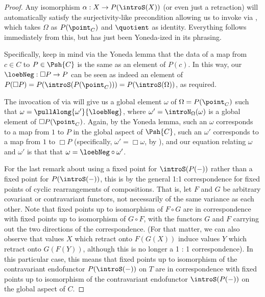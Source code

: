 \begin{proof}
Any isomorphism $\alpha : X \to P(\introS(X))$ (or even just a retraction) will automatically satisfy the surjectivity-like precondition allowing us to invoke  via , which takes $\Omega$ as $P(\point_C)$ and $\quotient$ as identity. Everything follows immediately from this, but has just been Yoneda-ized in its phrasing.

Specifically, keep in mind via the Yoneda lemma that the data of a map from $c \in C$ to $P \in \Psh{C}$ is the same as an element of $P(c)$. In this way, our $\loebNeg : \Box P \to P$ can be seen as indeed an element of $P(\Box P) = P(\introS(P(\point_C))) = P(\introS(\Omega))$, as required.

The invocation of  via  will give us a global element $\omega$ of $\Omega = P(\point_C)$ such that $\omega = \pullAlong{\omega'}{\loebNeg}$, where $\omega' = \introN_{\Omega}(\omega)$ is a global element of $\Box P(\point_C)$. Again, by the Yoneda lemma, such an $\omega$ corresponds to a map from $1$ to $P$ in the global aspect of $\Psh{C}$, such an $\omega'$ corresponds to a map from $1$ to $\Box P$ (specifically, $\omega' = \Box \omega$, by ), and our equation relating $\omega$ and $\omega'$ is that that $\omega = \loebNeg \circ \omega'$.

For the last remark about using a fixed point for $\introS(P(-))$ rather than a fixed point for $P(\introS(-))$, this is by the general 1:1 correspondence for fixed points of cyclic rearrangements of compositions. That is, let $F$ and $G$ be arbitrary covariant or contravariant functors, not necessarily of the same variance as each other. Note that fixed points up to isomorphism of $F \circ G$ are in correspondence with fixed points up to isomorphism of $G \circ F$, with the functors $G$ and $F$ carrying out the two directions of the correspondence. (For that matter, we can also observe that values $X$ which retract onto $F(G(X))$ induce values $Y$ which retract onto $G(F(Y))$, although this is no longer a 1 : 1 correspondence). In this particular case, this means that fixed points up to isomorphism of the contravariant endofunctor $P(\introS(-))$ on $T$ are in correspondence with fixed points up to isomorphism of the contravariant endofunctor $\introS(P(-))$ on the global aspect of $C$. 
\end{proof}

